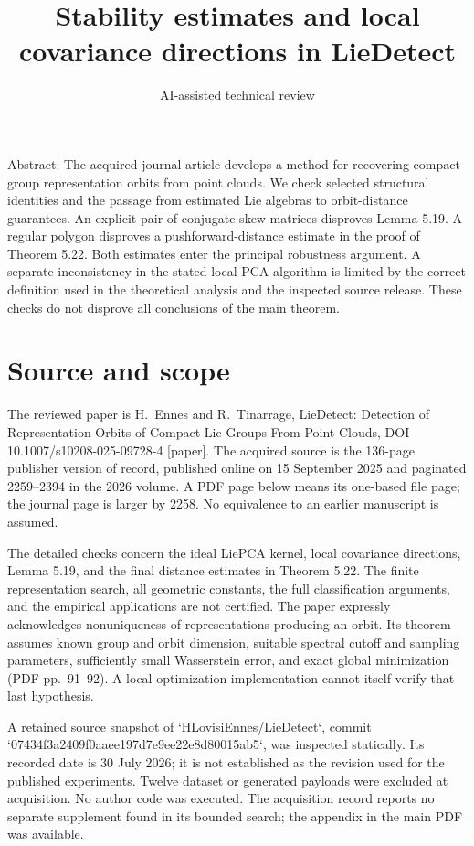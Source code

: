 \documentclass[10pt]{article}
\title{Stability estimates and local covariance directions in LieDetect}
\author{AI-assisted technical review}
\date{}
\begin{document}
\maketitle
Abstract: The acquired journal article develops a method for recovering compact-group representation orbits from point clouds. We check selected structural identities and the passage from estimated Lie algebras to orbit-distance guarantees. An explicit pair of conjugate skew matrices disproves Lemma 5.19. A regular polygon disproves a pushforward-distance estimate in the proof of Theorem 5.22. Both estimates enter the principal robustness argument. A separate inconsistency in the stated local PCA algorithm is limited by the correct definition used in the theoretical analysis and the inspected source release. These checks do not disprove all conclusions of the main theorem.\par
\section*{Source and scope}
The reviewed paper is H. Ennes and R. Tinarrage, LieDetect: Detection of Representation Orbits of Compact Lie Groups From Point Clouds, DOI 10.1007/s10208-025-09728-4 [paper]. The acquired source is the 136-page publisher version of record, published online on 15 September 2025 and paginated 2259–2394 in the 2026 volume. A PDF page below means its one-based file page; the journal page is larger by 2258. No equivalence to an earlier manuscript is assumed.\par
The detailed checks concern the ideal LiePCA kernel, local covariance directions, Lemma 5.19, and the final distance estimates in Theorem 5.22. The finite representation search, all geometric constants, the full classification arguments, and the empirical applications are not certified. The paper expressly acknowledges nonuniqueness of representations producing an orbit. Its theorem assumes known group and orbit dimension, suitable spectral cutoff and sampling parameters, sufficiently small Wasserstein error, and exact global minimization (PDF pp. 91–92). A local optimization implementation cannot itself verify that last hypothesis.\par
A retained source snapshot of `HLovisiEnnes/LieDetect`, commit `07434f3a2409f0aaee197d7e9ee22e8d80015ab5`, was inspected statically. Its recorded date is 30 July 2026; it is not established as the revision used for the published experiments. Twelve dataset or generated payloads were excluded at acquisition. No author code was executed. The acquisition record reports no separate supplement found in its bounded search; the appendix in the main PDF was available.\par
\end{document}
